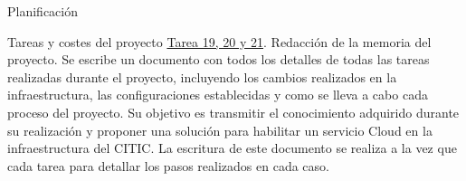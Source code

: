 \begin{chapter}{Planificación}
\begin{section}{Tareas y costes del proyecto}
\underline{Tarea 19, 20 y 21}. Redacción de la memoria del proyecto. Se escribe un documento con todos los detalles de todas las tareas realizadas durante el proyecto, incluyendo los cambios realizados en la infraestructura, las configuraciones establecidas y como se lleva a cabo cada proceso del proyecto. Su objetivo es transmitir el conocimiento adquirido durante su realización y proponer una solución para habilitar un servicio Cloud en la infraestructura del CITIC. La escritura de este documento se realiza a la vez que cada tarea para detallar los pasos realizados en cada caso.\\


\end{section}
\end{chapter}
